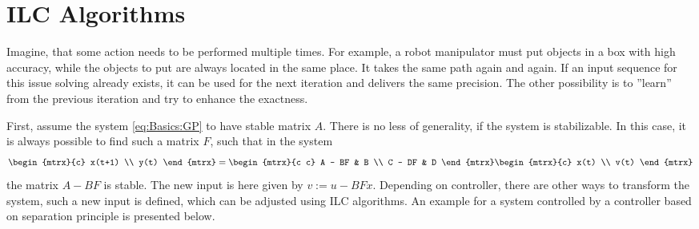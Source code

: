 \chapter{ILC Algorithms}
\label{ch:ILCAlg}

\newcommand{\IAgood}{30}
\newcommand{\IAbad}{50}
\newcommand{\badCondNb}{$1.353\, 10^{16}$}
\newcommand{\tol}{10^{-8}}



Imagine, that some action needs to be performed multiple times. 
For example, a robot manipulator must put objects in a box with high accuracy, while the objects to put are always located in the same place. It takes the same path again and again. If an input sequence for this issue solving already exists, it can be used for the next iteration and delivers the same precision. The other possibility is to ''learn'' from the previous iteration and try to enhance the exactness.




First, assume the system \eqref{eq:Basics:GP} to have stable matrix $A$. There is no less of generality, if the system is stabilizable. 
In this case, it is always possible to find such a matrix $F$, such that in the system 
\begin{align}
\begin{mtrx}{c}
x(t+1) \\ y(t)
\end{mtrx} = 
\begin{mtrx}{c c}
A - BF & B \\ C - DF & D
\end{mtrx}
\begin{mtrx}{c}
x(t) \\ v(t)
\end{mtrx}
\end{align}
the matrix $A - BF$ is stable. The new input is here given by $v:= u - B F x$. Depending on controller, there are other ways to transform the system, such a new input is defined, which can be adjusted using ILC algorithms. An example for a system controlled by a controller based on separation principle is presented below. 


